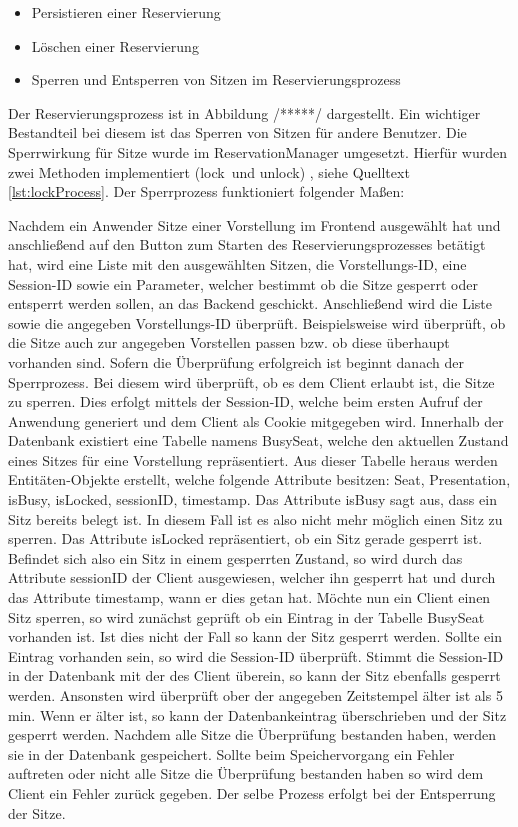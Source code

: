 	\begin{itemize}
		\setlength\itemsep{-0.5em}
		\item Persistieren einer Reservierung
		\item Löschen einer Reservierung
		\item Sperren und Entsperren von Sitzen im Reservierungsprozess
	\end{itemize}
	
	Der Reservierungsprozess ist in Abbildung /*****/ dargestellt. Ein wichtiger Bestandteil bei diesem ist das Sperren von Sitzen für andere Benutzer. Die Sperrwirkung für Sitze wurde im ReservationManager umgesetzt. Hierfür wurden zwei Methoden implementiert (\glqq lock\grqq \, und \glqq unlock\grqq) , siehe Quelltext \ref{lst:lockProcess}. Der Sperrprozess funktioniert folgender Maßen:
	
	Nachdem ein Anwender Sitze einer Vorstellung im Frontend ausgewählt hat und anschließend auf den Button zum Starten des Reservierungsprozesses betätigt hat, wird eine Liste mit den ausgewählten Sitzen, die Vorstellungs-\ac{ID}, eine Session-\ac{ID} sowie ein Parameter, welcher bestimmt ob die Sitze gesperrt oder entsperrt werden sollen, an das Backend geschickt. Anschließend wird die Liste sowie die angegeben Vorstellungs-\ac{ID} überprüft. Beispielsweise wird überprüft, ob die Sitze auch zur angegeben Vorstellen passen bzw. ob diese überhaupt vorhanden sind. Sofern die Überprüfung erfolgreich ist beginnt danach der Sperrprozess. Bei diesem wird überprüft, ob es dem Client erlaubt ist, die Sitze zu sperren. Dies erfolgt mittels der Session-ID, welche beim ersten Aufruf der Anwendung generiert und dem Client als Cookie mitgegeben wird. Innerhalb der Datenbank existiert eine Tabelle namens \glqq BusySeat\grqq, welche den aktuellen Zustand eines Sitzes für eine Vorstellung repräsentiert. Aus dieser Tabelle heraus werden Entitäten-Objekte erstellt, welche folgende Attribute besitzen: \glqq Seat, Presentation, isBusy, isLocked, sessionID, timestamp\grqq. Das Attribute isBusy sagt aus, dass ein Sitz bereits belegt ist. In diesem Fall ist es also nicht mehr möglich einen Sitz zu sperren. Das Attribute isLocked repräsentiert, ob ein Sitz gerade gesperrt ist. Befindet sich also ein Sitz in einem gesperrten Zustand, so wird durch das Attribute sessionID der Client ausgewiesen, welcher ihn gesperrt hat und durch das Attribute timestamp, wann er dies getan hat. Möchte nun ein Client einen Sitz sperren, so wird zunächst geprüft ob ein Eintrag in der Tabelle BusySeat vorhanden ist. Ist dies nicht der Fall so kann der Sitz gesperrt werden. Sollte ein Eintrag vorhanden sein, so wird die Session-ID überprüft. Stimmt die Session-ID in der Datenbank mit der des Client überein, so kann der Sitz ebenfalls gesperrt werden. Ansonsten wird überprüft ober der angegeben Zeitstempel älter ist als 5 min. Wenn er älter ist, so kann der Datenbankeintrag überschrieben und der Sitz gesperrt werden. Nachdem alle Sitze die Überprüfung bestanden haben, werden sie in der Datenbank gespeichert. Sollte beim Speichervorgang ein Fehler auftreten oder nicht alle Sitze die Überprüfung bestanden haben so wird dem Client ein Fehler zurück gegeben. Der selbe Prozess erfolgt bei der Entsperrung der Sitze.
	
